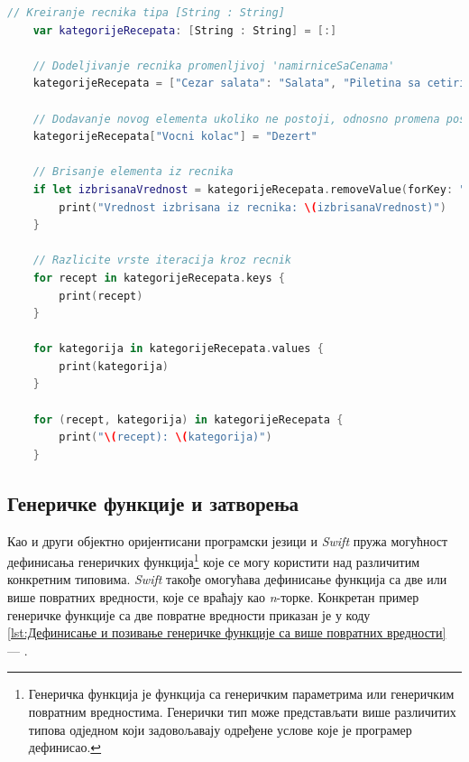 \documentclass[12pt,oneside]{memoir}
\begin{document}
\begin{lstlisting}[caption=\textit{{Рад са речницима}}, label={lst:Рад са речницима}, language=Swift, frame=single]
    // Kreiranje recnika tipa [String : String]
    var kategorijeRecepata: [String : String] = [:]
    
    // Dodeljivanje recnika promenljivoj 'namirniceSaCenama'
    kategorijeRecepata = ["Cezar salata": "Salata", "Piletina sa cetiri vrste sira": "Glavno jelo", "Omlet": "Toplo predjelo"]
    
    // Dodavanje novog elementa ukoliko ne postoji, odnosno promena postojeceg
    kategorijeRecepata["Vocni kolac"] = "Dezert"
    
    // Brisanje elementa iz recnika
    if let izbrisanaVrednost = kategorijeRecepata.removeValue(forKey: "Omlet") {
        print("Vrednost izbrisana iz recnika: \(izbrisanaVrednost)")
    }
    
    // Razlicite vrste iteracija kroz recnik
    for recept in kategorijeRecepata.keys {
        print(recept)
    }
    
    for kategorija in kategorijeRecepata.values {
        print(kategorija)
    }

    for (recept, kategorija) in kategorijeRecepata {
        print("\(recept): \(kategorija)")
    }
\end{lstlisting}

\subsection{Генеричке функције и затворења}

\indent Као и други објектно оријентисани програмски језици и \textit{Swift} пружа могућност дефинисања генеричких функција\footnote{Генеричка функција је функција са генеричким параметрима или генеричким повратним вредностима. Генерички тип може представљати више различитих типова одједном који задовољавају одређене услове које је програмер дефинисао.} које се могу користити над различитим конкретним типовима. \textit{Swift} такође омогућава дефинисање функција са две или више повратних вредности, које се враћају као \textit{n}-торке. Конкретан пример генеричке функције са две повратне вредности приказан је у коду \ref{lst:Дефинисање и позивање генеричке функције са више повратних вредности} --- . 
\end{document}

